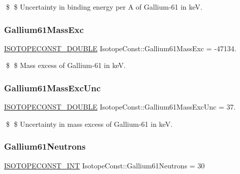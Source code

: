 \$ \$ Uncertainty in binding energy per A of Gallium-\/61 in keV. \mbox{\label{group___isotope_const-_gallium-_ga61_ga50facd3fe6196e434920c91e61a8c0b0}} 
\subsubsection{\texorpdfstring{Gallium61\+Mass\+Exc}{Gallium61MassExc}}
{\footnotesize\ttfamily \mbox{\hyperlink{group___isotope_const-_macros_ga8f45a7272ce02c0b4c65c44636ed719a}{I\+S\+O\+T\+O\+P\+E\+C\+O\+N\+S\+T\+\_\+\+D\+O\+U\+B\+LE}} Isotope\+Const\+::\+Gallium61\+Mass\+Exc = -\/47134.}

\$ \$ Mass excess of Gallium-\/61 in keV. \mbox{\label{group___isotope_const-_gallium-_ga61_ga16bce98d0e00cea3fefb0c38e5fd80c4}} 
\subsubsection{\texorpdfstring{Gallium61\+Mass\+Exc\+Unc}{Gallium61MassExcUnc}}
{\footnotesize\ttfamily \mbox{\hyperlink{group___isotope_const-_macros_ga8f45a7272ce02c0b4c65c44636ed719a}{I\+S\+O\+T\+O\+P\+E\+C\+O\+N\+S\+T\+\_\+\+D\+O\+U\+B\+LE}} Isotope\+Const\+::\+Gallium61\+Mass\+Exc\+Unc = 37.}

\$ \$ Uncertainty in mass excess of Gallium-\/61 in keV. \mbox{\label{group___isotope_const-_gallium-_ga61_ga3260dcfba167fcd4e087096f3a74b02c}} 
\subsubsection{\texorpdfstring{Gallium61\+Neutrons}{Gallium61Neutrons}}
{\footnotesize\ttfamily \mbox{\hyperlink{group___isotope_const-_macros_ga5f18360b3e99483a35c32d789e62621c}{I\+S\+O\+T\+O\+P\+E\+C\+O\+N\+S\+T\+\_\+\+I\+NT}} Isotope\+Const\+::\+Gallium61\+Neutrons = 30}

